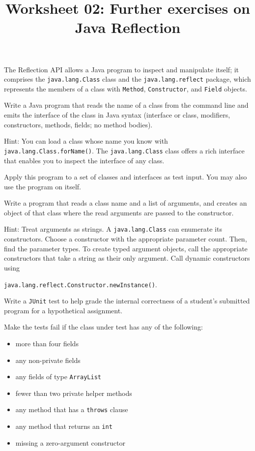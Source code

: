 \documentclass[11pt,a4paper,answers]{exam}
\title{Worksheet 02: Further exercises on Java Reflection}
\author{}
\date{}
\begin{document}
\maketitle

The Reflection API allows a Java program to inspect and manipulate itself; it comprises the \verb!java.lang.Class! 
class and the \verb!java.lang.reflect! package, which represents the members of a class with \verb!Method!, 
\verb!Constructor!, and \verb!Field! objects.

\begin{questions}
\question
Write a Java program that reads the name of a class from the command line and emits the interface of the class in Java 
syntax (interface or class, modifiers, constructors, methods, fields; no method bodies). 

Hint: You can load a class whose name you know with \verb!java.lang.Class.forName()!. The 
\verb!java.lang.Class! class offers a rich interface that enables you to inspect the interface of any class.

Apply this program to a set of classes and interfaces as test input. You may also use the program on itself.

\question
Write a program that reads a class name and a list of arguments, 
and creates an object of that class where the read arguments are passed to the constructor.

Hint: Treat arguments as strings. A \verb!java.lang.Class! can enumerate its constructors. 
Choose a constructor with the appropriate parameter count. 
Then, find the parameter types. To create typed argument objects, call the appropriate constructors 
that take a string as their only argument. 
Call dynamic constructors using 

\verb!java.lang.reflect.Constructor.newInstance()!.

\question
Write a \verb!JUnit! test to help grade the internal correctness of a student's submitted program for a hypothetical 
assignment.

Make the tests fail if the class under test has any of the following:
\begin{itemize}
\item more than four fields
\item any non-private fields
\item any fields of type \verb!ArrayList!
\item fewer than two private helper methods
\item any method that has a \verb!throws! clause
\item any method that returns an \verb!int!
\item missing a zero-argument constructor	
\end{itemize}


\end{questions}
\end{document}
